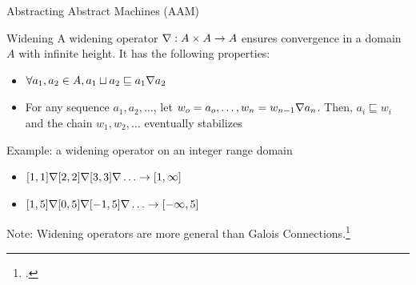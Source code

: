 \documentclass[aspectratio=169]{beamer}
\begin{document}
\begin{frame}{Abstracting Abstract Machines (AAM)}
\end{frame}

\begin{frame}{Widening}
  \small
  A widening operator $\nabla : A \times A \to A$ ensures convergence
  in a domain $A$ with infinite height. It has the following
  properties:\vspace{-0.3em}
  \begin{itemize}\footnotesize
  \item $\forall a_1, a_2 \in A, a_1 \sqcup a_2 \sqsubseteq a_1 \nabla a_2$
  \item For any sequence $a_1, a_2, \ldots$, let $w_o = a_o, \ldots, w_n = w_{n-1} \nabla a_n$. Then, $a_i \sqsubseteq w_i$ and the chain $w_1, w_2, \ldots$ eventually stabilizes
  \end{itemize}\pause\vspace{-0.3em}
  \begin{exampleblock}{\small Example: a widening operator on an integer range domain}
    \vspace{-0.8em}
  \begin{itemize}[<+->]\footnotesize
  \item $[1,1] \nabla [2,2] \nabla [3,3] \nabla \ldots \to [1, \infty]$
  \item $[1,5] \nabla [0,5] \nabla [-1,5] \nabla \ldots \to [-\infty, 5]$
  \end{itemize}
\end{exampleblock}\vspace{-1.6em}\pause
Note: Widening operators are more general than Galois Connections.\footcite{cousot92comparing}\vspace{1em}
\end{frame}


\end{document}
